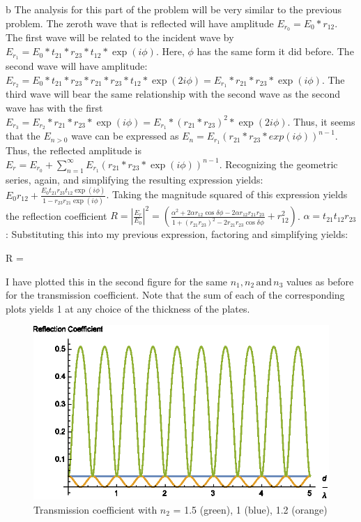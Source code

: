 \begin{homeworkProblem}
\begin{homeworkSection}{b}
The analysis for this part of the problem will be very similar to the previous problem. The zeroth wave that is reflected will have amplitude $E_{r_0} = E_0*r_{12}$. The first wave will be related to the incident wave by $E_{r_1} = E_0*t_{21}*r_{23}*t_{12}*\exp(i\phi)$. Here, $\phi$ has the same form it did before. The second wave will have amplitude: $E_{r_2} = E_0*t_{21}*r_{23}*r_{21}*r_{23}*t_{12}*\exp(2 i\phi) = E_{r_1} * r_{21}*r_{23}*\exp(i\phi)$. The third wave will bear the same relationship with the second wave as the second wave has with the first $E_{r_3} = E_{r_2} *r_{21} * r_{23}*\exp(i\phi) = E_{r_1} * (r_{21}*r_{23})^2*\exp(2i\phi)$. Thus, it seems that the $E_{n>0}$ wave can be expressed as $E_{n} = E_{r_1}(r_{21}*r_{23}*exp(i\phi))^{n-1}$.
\\
Thus, the reflected amplitude is $E_{r} = E_{r_0} + \sum\limits_{n=1}^\infty E_{r_1}(r_{21}*r_{23}*\exp(i\phi))^{n-1}$. Recognizing the geometric series, again, and simplifying the resulting expression yields: $E_0 r_{12} + \frac{E_0 t_{21}r_{23}t_{12}\exp(i\phi)}{1-r_{23}r_{21}\exp(i\phi)}$. Taking the magnitude squared of this expression yields the reflection coefficient $R = |\frac{E_r}{E_0}|^2 = (\frac{\alpha^2 + 2 \alpha r_{12}\cos\delta\phi - 2\alpha r_{12}r_{21}r_{23}}{1+(r_{21}r_{23})^2-2 r_{21} r_{23} \cos\delta\phi} + r_{12}^2)$. $\alpha = t_{21}t_{12}r_{23}$: Substituting this into my previous expression, factoring and simplifying yields:
\begin{problemAnswer}{
R = 
}
\end{problemAnswer}

I have plotted this in the second figure for the same $n_1, n_2 \,\text{and}\, n_3$ values as before for the transmission coefficient. Note that the sum of each of the corresponding plots yields 1 at any choice of the thickness of the plates.

\begin{figure}
  \centering\includegraphics[width=.5\textwidth]{Images/RefCoef.eps}
  \caption{Transmission coefficient with $n_2$ = 1.5 (green), 1 (blue), 1.2 (orange)}
\end{figure}


\end{homeworkSection}
\end{homeworkProblem}
